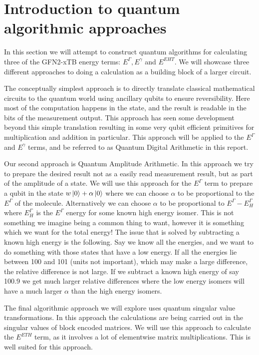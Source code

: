 \section{Introduction to quantum algorithmic approaches}
In this section we will attempt to construct quantum algorithms for calculating three of the GFN2-xTB\cite{bannwarth2019} energy terms: $E^\Gamma, E^\gamma$ and $E^{EHT}$.
We will showcase three different approaches to doing a calculation as a building block of a larger circuit.


The conceptually simplest approach is to directly translate classical mathematical circuits to the quantum world using ancillary qubits to ensure reversibility.
Here most of the computation happens in the state, and the result is readable in the bits of the measurement output.
This approach has seen some development beyond this simple translation resulting in some very qubit efficient primitives for multiplication and addition in particular\cite{draper2000,perez2017}.
This approach will be applied to the $E^\Gamma$ and $E^\gamma$ terms, and be referred to as Quantum Digital Arithmetic in this report. 


Our second approach is Quantum Amplitude Arithmetic\cite{wang2020}. 
In this approach we try to prepare the desired result not as a easily read measurement result, but as part of the amplitude of a state.
We will use this approach for the $E^\Gamma$ term to prepare a qubit in the state $w\ket{0}+\alpha\ket{0}$ where we can choose $\alpha$ to be proportional to the $E^\Gamma$ of the molecule.
Alternatively we can choose $\alpha$ to be proportional to $E^\Gamma-E^\Gamma_H$ where $E^\Gamma_H$ is the $E^\Gamma$ energy for some known high energy isomer.
This is not something we imagine being a common thing to want, however it is something which we want for the total energy! The issue that is solved by subtracting a known high energy is the following.
Say we know all the energies, and we want to do something with those states that have a low energy.
If all the energies lie between 100 and 101 (units not important), which may make a large difference, the relative difference is not large.
If we subtract a known high energy of say 100.9 we get much larger relative differences where the low energy isomers will have a much larger $\alpha$ than the high energy isomers. 


The final algorithmic approach we will explore uses quantum singular value transformations\cite{gilyen2019}.
In this approach the calculations are being carried out in the singular values of block encoded matrices. 
We will use this approach to calculate the $E^{ETH}$ term, as it involves a lot of elementwise matrix multiplications. 
This is well suited for this approach.


